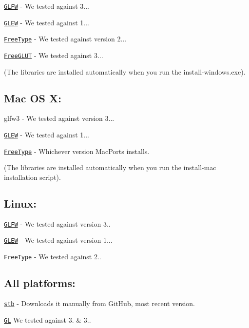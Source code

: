 \href{https://github.com/glfw/glfw/releases/download/3.1.1/glfw-3.1.1.zip}{\tt G\-L\-F\-W} -\/ We tested against 3...

\href{http://downloads.sourceforge.net/project/glew/glew/1.12.0/glew-1.12.0.zip}{\tt G\-L\-E\-W} -\/ We tested against 1...

\href{http://downloads.sourceforge.net/project/gnuwin32/freetype/2.3.5-1/freetype-2.3.5-1-bin.zip}{\tt Free\-Type} -\/ We tested against version 2...

\href{http://downloads.sourceforge.net/project/freeglut/freeglut/3.0.0/freeglut-3.0.0.tar.gz}{\tt Free\-G\-L\-U\-T} -\/ We tested against 3...

(The libraries are installed automatically when you run the install-\/windows.\-exe).

\subsection*{Mac O\-S X\-:}

glfw3 -\/ We tested against version 3...

\href{http://downloads.sourceforge.net/project/glew/glew/1.12.0/glew-1.12.0.zip}{\tt G\-L\-E\-W} -\/ We tested against 1...

\href{http://downloads.sourceforge.net/project/gnuwin32/freetype/2.3.5-1/freetype-2.3.5-1-bin.zip}{\tt Free\-Type} -\/ Whichever version Mac\-Ports installs.

(The libraries are installed automatically when you run the install-\/mac installation script).

\subsection*{Linux\-:}

\href{http://www.glfw.org/download.html}{\tt G\-L\-F\-W} -\/ We tested against version 3..

\href{http://glew.sourceforge.net/}{\tt G\-L\-E\-W} -\/ We tested against version 1...

\href{http://www.freetype.org/download.html}{\tt Free\-Type} -\/ We tested against 2..

\subsection*{All platforms\-:}

\href{https://github.com/nothings/stb/archive/master.zip}{\tt stb} -\/ Downloads it manually from Git\-Hub, most recent version.

\href{https://www.opengl.org/}{\tt G\-L} We tested against 3. \& 3.. 